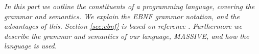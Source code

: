 \textit{In this part we outline the constituents of a programming language, covering the grammar and semantics. We explain the EBNF grammar notation, and the advantages of this. Section \ref{sec:ebnf} is based on reference \cite{misc:spo}. Furthermore we describe the grammar and semantics of our language, MASSIVE, and how the language is used.}\\ \\